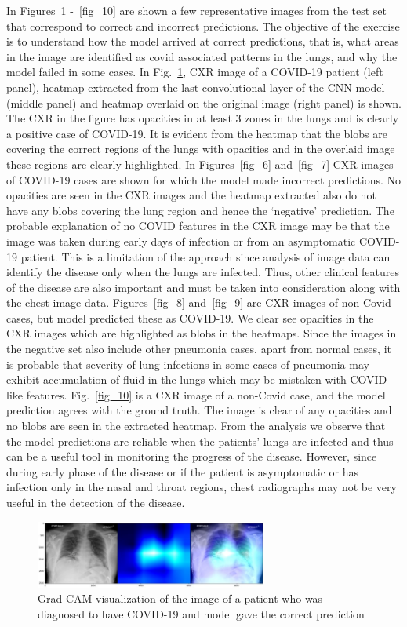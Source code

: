 \documentclass[10pt,journal,compsoc]{IEEEtran}
\begin{document}
In Figures~\ref{fig_5} -~\ref{fig_10} are shown a few representative images from the test set that correspond to correct and incorrect predictions. The objective of the exercise is to understand how the model arrived at correct predictions, that is, what areas in the image are identified as covid associated patterns in the lungs, and why the model failed in some cases. In Fig.~\ref{fig_5}, CXR image of a COVID-19 patient (left panel), heatmap extracted from the last convolutional layer of the CNN model (middle panel) and heatmap overlaid on the original image (right panel) is shown. The CXR in the figure has opacities in at least 3 zones in the lungs and is clearly a positive case of COVID-19. It is evident from the heatmap that the blobs are covering the correct regions of the lungs with opacities and in the overlaid image these regions are clearly highlighted. In Figures~\ref{fig_6} and~\ref{fig_7} CXR images of COVID-19 cases are shown for which the model made incorrect predictions. No opacities are seen in the CXR images and the heatmap extracted also do not have any blobs covering the lung region and hence the ‘negative’ prediction. The probable explanation of no COVID features in the CXR image may be that the image was taken during early days of infection or from an asymptomatic COVID-19 patient. This is a limitation of the approach since analysis of image data can identify the disease only when the lungs are infected. Thus, other clinical features of the disease are also important and must be taken into consideration along with the chest image data. Figures~\ref{fig_8} and~\ref{fig_9} are CXR images of non-Covid cases, but model predicted these as COVID-19. We clear see opacities in the CXR images which are highlighted as blobs in the heatmaps. Since the images in the negative set also include other pneumonia cases, apart from normal cases, it is probable that severity of lung infections in some cases of pneumonia may exhibit accumulation of fluid in the lungs which may be mistaken with COVID-like features. Fig.~\ref{fig_10} is a CXR image of a non-Covid case, and the model prediction agrees with the ground truth. The image is clear of any opacities and no blobs are seen in the extracted heatmap. From the analysis we observe that the model predictions are reliable when the patients’ lungs are infected and thus can be a useful tool in monitoring the progress of the disease. However, since during early phase of the disease or if the patient is asymptomatic or has infection only in the nasal and throat regions, chest radiographs may not be very useful in the detection of the disease.   
\begin{figure}
\centering
\includegraphics[width=3.0in]{Picture3.jpg}
\caption{Grad-CAM visualization of the image of a patient who was diagnosed to have COVID-19 and model gave the correct prediction}
\label{fig_5}
\end{figure}
\end{document}
